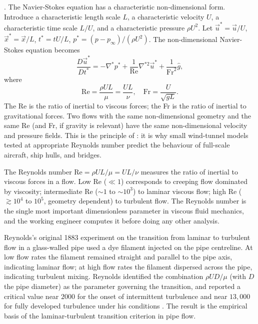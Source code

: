 . The Navier-Stokes equation has a
characteristic non-dimensional form. Introduce a characteristic
length scale $L$, a characteristic velocity $U$, a characteristic
time scale $L/U$, and a characteristic pressure $\rho U^2$. Let
$\vec{u}^* = \vec{u}/U$, $\vec{x}^* = \vec{x}/L$, $t^* = tU/L$,
$p^* = (p - p_\infty)/(\rho U^2)$. The non-dimensional
Navier-Stokes equation becomes
\[
\frac{D\vec{u}^*}{Dt^*} = -\nabla^* p^* + \frac{1}{\text{Re}}
\nabla^{*2}\vec{u}^* + \frac{1}{\text{Fr}^2}\hat{g},
\]
where
\[
\text{Re} = \frac{\rho U L}{\mu} = \frac{U L}{\nu}, \quad
\text{Fr} = \frac{U}{\sqrt{gL}}.
\]
The  Re is the ratio of inertial to
viscous forces; the  Fr is the ratio of
inertial to gravitational forces. Two flows with the same
non-dimensional geometry and the same Re (and Fr, if gravity is
relevant) have the same non-dimensional velocity and pressure
fields. This is the principle of : it
is why small wind-tunnel models tested at appropriate Reynolds
number predict the behaviour of full-scale aircraft, ship hulls,
and bridges.

\begin{principle}
The Reynolds number $\text{Re} = \rho U L/\mu = U L/\nu$ measures
the ratio of inertial to viscous forces in a flow. Low Re ($\ll 1$)
corresponds to creeping flow dominated by viscosity; intermediate
Re ($\sim 1$ to $\sim 10^3$) to laminar viscous flow; high Re
($\gtrsim 10^4$ to $10^5$, geometry dependent) to turbulent flow.
The Reynolds number is the single most important dimensionless
parameter in viscous fluid mechanics, and the working engineer
computes it before doing any other analysis.
\end{principle}

Reynolds's original 1883 experiment on the transition from laminar
to turbulent flow in a glass-walled pipe used a dye filament
injected on the pipe centreline. At low flow rates the filament
remained straight and parallel to the pipe axis, indicating
laminar flow; at high flow rates the filament dispersed across
the pipe, indicating turbulent mixing. Reynolds identified the
combination $\rho U D/\mu$ (with $D$ the pipe diameter) as the
parameter governing the transition, and reported a critical value
near $2000$ for the onset of intermittent turbulence and near
$13{,}000$ for fully developed turbulence under his conditions
\cite[pp.~935--982]{paper:reynolds1883}. The result is the
empirical basis of the laminar-turbulent transition criterion in
pipe flow.

